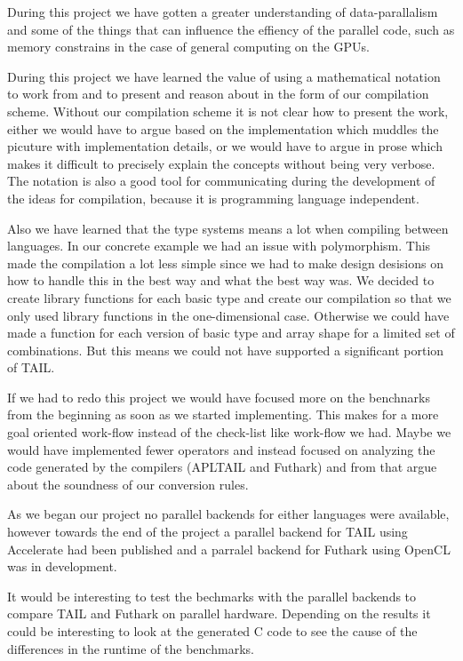 \documentclass[11pt]{article}
\begin{document}
During this project we have gotten a greater understanding of data-parallalism and some of the things that can influence the effiency of the parallel code, such as memory constrains in the case of general computing on the GPUs. 

During this project we have learned the value of using a mathematical notation to work from and to present and reason about in the form of our compilation scheme. 
Without our compilation scheme it is not clear how to present the work, either we would have to argue based on the
implementation which muddles the picuture with implementation details, or we would have to argue in prose which
makes it difficult to precisely explain the concepts without being very verbose.
The notation is also a good tool for communicating during the development of the ideas for compilation, because it is programming language independent.

Also we have learned that the type systems means a lot when compiling between languages. 
In our concrete example we had an issue with polymorphism.
This made the compilation a lot less simple since we had to make design desisions on how to handle this in the best way and what the best way was. 
We decided to create library functions for each basic type and create our compilation so that we only used library functions in the one-dimensional case.
Otherwise we could have made a function for each version of basic type and array shape for a limited set of combinations. But this means we could not have supported a significant portion of TAIL.

If we had to redo this project we would have focused more on the benchnarks from the beginning as soon as we
started implementing. This makes for a more goal oriented work-flow instead of the check-list like work-flow we had.
Maybe we would have implemented fewer operators and instead focused on analyzing the code generated by the compilers (APLTAIL and Futhark) and
from that argue about the soundness of our conversion rules.

As we began our project no parallel backends for either languages were available, however towards the end of the project a
parallel backend for TAIL using Accelerate had been published \cite{Array:2015} and a parralel backend for Futhark using OpenCL
was in development.

It would be interesting to test the bechmarks with the parallel backends to compare TAIL and Futhark on parallel hardware.
Depending on the results it could be interesting to look at the generated C code to see the cause of the differences in the
runtime of the benchmarks.
\end{document}
